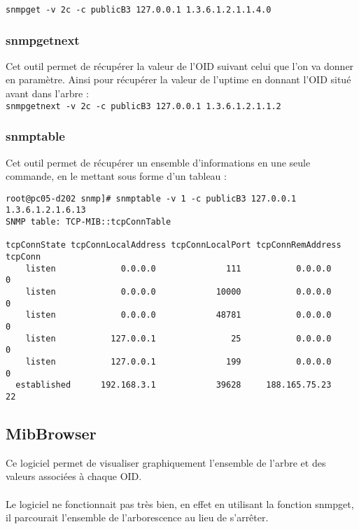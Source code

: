 \documentclass[12pt,a4paper,notitlepage]{article}
\begin{document}
\noindent \texttt{snmpget -v 2c -c publicB3 127.0.0.1 1.3.6.1.2.1.1.4.0}

\subsubsection{snmpgetnext}
Cet outil permet de récupérer la valeur de l'OID suivant celui que l'on va donner en paramètre. Ainsi pour récupérer la valeur de l'uptime en donnant l'OID situé avant dans l'arbre :\\

\noindent \texttt{snmpgetnext -v 2c -c publicB3 127.0.0.1 1.3.6.1.2.1.1.2}

\subsubsection{snmptable}
Cet outil permet de récupérer un ensemble d'informations en une seule commande, en le mettant sous forme d'un tableau :\\

\begin{lstlisting}[title=Résultat snmptable pour les connexions TCP]
root@pc05-d202 snmp]# snmptable -v 1 -c publicB3 127.0.0.1 1.3.6.1.2.1.6.13
SNMP table: TCP-MIB::tcpConnTable

tcpConnState tcpConnLocalAddress tcpConnLocalPort tcpConnRemAddress tcpConn
    listen             0.0.0.0              111           0.0.0.0        0
    listen             0.0.0.0            10000           0.0.0.0        0
    listen             0.0.0.0            48781           0.0.0.0        0
    listen           127.0.0.1               25           0.0.0.0        0
    listen           127.0.0.1              199           0.0.0.0        0
  established      192.168.3.1            39628     188.165.75.23       22
\end{lstlisting}

\subsection{MibBrowser}
Ce logiciel permet de visualiser graphiquement l'ensemble de l'arbre et des valeurs associées à chaque OID.

\paragraph{} Le logiciel ne fonctionnait pas très bien, en effet en utilisant la fonction snmpget, il parcourait l'ensemble de l'arborescence au lieu de s'arrêter.
\end{document}
